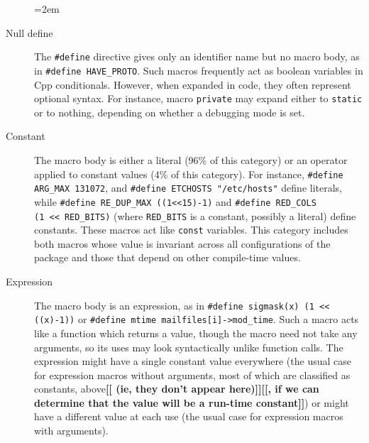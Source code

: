 \documentclass[10pt]{article}
\newcommand{\comment}[1]{\textbf{[[#1]]}}
\begin{document}
\begin{description}
  \sloppy
  \emergencystretch=2em


\item[Null define]  The {\tt \#define} directive gives only an
  identifier name but no macro body, as in {\tt \#define
  \verb|HAVE_PROTO|}\@.  Such macros frequently act as boolean variables in
Cpp conditionals.  However, when expanded in code,
they often represent optional syntax.  For
instance, macro {\tt private} may expand either to {\tt static} or to
nothing, depending on whether a debugging mode is set.

\item[Constant] The macro body is either a literal (96\% of this category)
  or an operator applied to constant values (4\% of this category).  For
  instance, {\tt \#define \verb|ARG_MAX| 131072}, and {\tt \#define
  ETCHOSTS "/etc/hosts"} define literals, while {\tt \#define
\verb|RE_DUP_MAX| ((1<<15)-1)} and {\tt \#define \verb|RED_COLS| (1~<<~\verb|RED_BITS|)} (where \verb|RED_BITS| is a constant, possibly a literal)
define constants.  These macros act like {\tt const} variables.  This
category includes both macros whose value is invariant across all
configurations of the package and those that depend on other compile-time
values.


\item[Expression]  The macro body is an expression, as in {\tt \#define
  sigmask(x) (1 << ((x)-1))} or {\tt \#define mtime mailfiles[i]->\verb|mod_time|}.
Such a macro acts like a function which returns a value, though the
macro need not take any arguments, so its uses may look syntactically
unlike function calls. 
The expression might have a single constant value everywhere (the usual
case for expression macros without arguments, most of which are classified
as constants, above\comment{ (ie, they don't appear here)}\comment{, if we can determine that the value will be a run-time constant}) or might have a different value at each use (the usual
case for expression macros with arguments).


\end{description}
\end{document}
